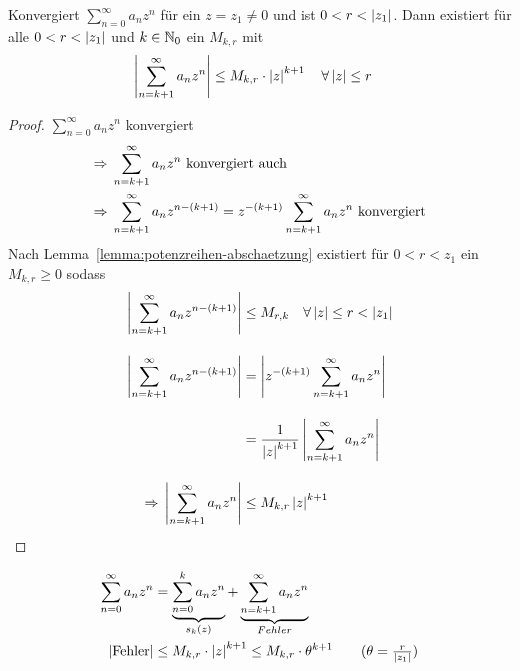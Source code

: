 \begin{lemma} %
    \label{lemma:temp-4}
    Konvergiert $\sum_{n=0}^{\infty} a_n z^n$ für ein $z=z_1 \neq 0$ und ist $0 < r < \left\lvert z_1\right\rvert$. Dann existiert für alle $0< r < \left\lvert z_1\right\rvert$ und $k\in\mathbb{N}_0$ ein $M_{k,r}$ mit
    \begin{align*}
        \left\lvert\sum_{n=k+1}^{\infty} a_n z^n\right\rvert &\leq M_{k,r}\cdot\left\lvert z\right\rvert^{k+1}\quad\forall \left\lvert z\right\rvert \leq r
    \end{align*}

    \begin{proof}
        $\sum_{n=0}^{\infty} a_n z^n$ konvergiert
        \begin{align*}
            \Rightarrow{} &\sum_{n=k+1}^{\infty} a_n z^n \text{ konvergiert auch }\\
            \Rightarrow{} &\sum_{n=k+1}^{\infty} a_n z^{n-(k+1)} = z^{-(k+1)} \sum_{n=k+1}^{\infty} a_n z^n \text{ konvergiert}
        \end{align*}
        Nach Lemma~\ref{lemma:potenzreihen-abschaetzung} existiert für $0<r<z_1$ ein $M_{k,r} \geq 0$ sodass
        \begin{align*}
            \left\lvert\sum_{n=k+1}^{\infty} a_n z^{n-(k+1)}\right\rvert &\leq M_{r,k}\quad\forall \left\lvert z\right\rvert \leq r < \left\lvert z_1\right\rvert\\[10pt]
            \left\lvert\sum_{n=k+1}^{\infty} a_n z^{n-(k+1)}\right\rvert &= \left\lvert z^{-(k+1)} \sum_{n=k+1}^{\infty} a_n z^n\right\rvert\\[10pt]
            &= \frac{1}{\left\lvert z\right\rvert^{k+1}} \left\lvert\sum_{n=k+1}^{\infty} a_n z^n\right\rvert\\[10pt]
            \Rightarrow{} \left\lvert\sum_{n=k+1}^{\infty} a_n z^n\right\rvert &\leq M_{k,r} \left\lvert z\right\rvert^{k+1}\qedhere
        \end{align*}
    \end{proof}
\end{lemma}

\begin{anwendung}[Fehlerabschätzung]
    \begin{align*}
        \sum_{n=0}^{\infty} a_n z^n &= \underbrace{\sum_{n=0}^{k} a_n z^n}_{s_k (z)} + \underbrace{\sum_{n=k+1}^{\infty} a_n z^n}_{Fehler}\\
        \abs{\text{Fehler}} &\leq M_{k,r}\cdot \abs{z}^{k+1} \leq M_{k,r}\cdot \theta^{k+1} \tag{$\theta = \frac{r}{\abs{z_1}}$}
    \end{align*}
\end{anwendung}


